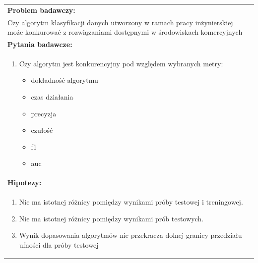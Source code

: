\begin{table}[H]
    \centering
    \begin{tabular}{|L{\textwidth}|}
        \hline
        \textbf{Problem badawczy:}                                                                                                                     \\
        Czy algorytm klasyfikacji danych utworzony w ramach pracy inżynierskiej może konkurować z rozwiązaniami dostępnymi w środowiskach komercyjnych \\ \hline

        \textbf{Pytania badawcze:}                                                                                                                     \\
        \begin{enumerate}
            \item Czy algorytm jest konkurencyjny pod względem wybranych metry:
            \begin{itemize}
                \item dokładność algorytmu
                \item czas działania
                \item precyzja
                \item czułość
                \item f1
                \item auc
            \end{itemize}
        \end{enumerate}                                                                                                                                \\ \hline

        \textbf{Hipotezy:}                                                                                                                             \\
        \begin{enumerate}
            \item Nie ma istotnej różnicy pomiędzy wynikami próby testowej i treningowej.
            \item Nie ma istotnej różnicy pomiędzy wynikami prób testowych.
            \item Wynik dopasowania algorytmów nie przekracza dolnej granicy przedziału ufności dla próby testowej
        \end{enumerate}                                                                                                                                \\ \hline
    \end{tabular}
    \label{tab:met-bad}
\end{table}

